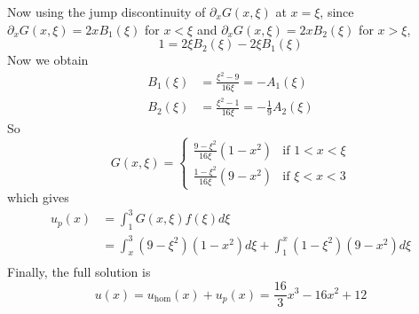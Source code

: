 \begin{example}
    Now using the jump discontinuity of $\partial_x G(x, \xi)$ at $x = \xi$, since $\partial_x G(x, \xi) = 2x B_1(\xi)$ for $x < \xi$ and $\partial_x G(x, \xi) = 2x B_2(\xi)$ for $x > \xi$,
    \[
        1 = 2 \xi B_2(\xi) - 2 \xi B_1(\xi)
    \]
    Now we obtain
    \[
        \begin{aligned}
            B_1(\xi) & = \frac{\xi^2 - 9}{16\xi} = -A_1(\xi) \\
            B_2(\xi) & = \frac{\xi^2 - 1}{16\xi} = -\frac{1}{9} A_2(\xi)
        \end{aligned}
    \]
    So
    \[
        G(x, \xi) = \begin{cases}
            \frac{9 - \xi^2}{16\xi} (1 - x^2) & \text{if } 1 < x < \xi \\
            \frac{1 - \xi^2}{16\xi} (9 - x^2) & \text{if } \xi < x < 3
        \end{cases}
    \]
    which gives
    \[
        \begin{aligned}
            u_p(x) & = \int_{1}^{3} G(x, \xi) f(\xi) d\xi \\
            & = \int_{x}^{3} (9 - \xi^2) (1 - x^2) d\xi + \int_{1}^{x} (1 - \xi^2)(9 - x^2) d\xi \\
        \end{aligned}
    \]
    Finally, the full solution is
    \[
        u(x) = u_{\text{hom}}(x) + u_p(x) = \frac{16}{3} x^3 - 16 x^2 + 12
    \]
\end{example}

